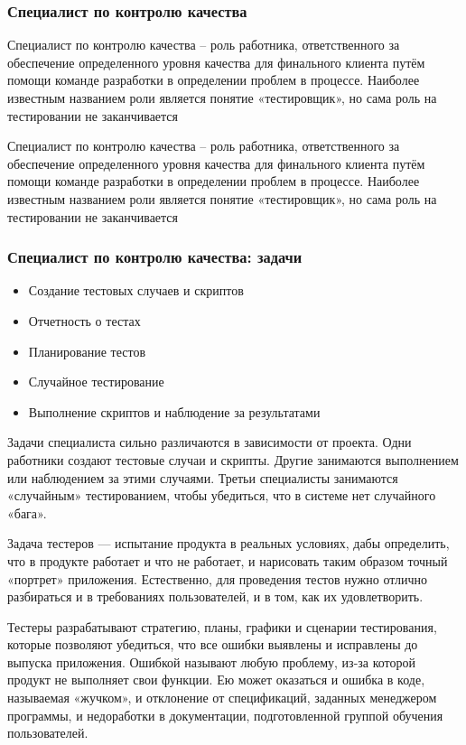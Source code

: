 \documentclass{../industrial-development}
\begin{document}
\begin{frame} \frametitle{Специалист по контролю качества}
	\begin{block}{}
		\alert {Специалист по контролю качества} – роль работника, ответственного за обеспечение определенного уровня качества для финального клиента путём помощи команде разработки в определении проблем в процессе. Наиболее известным названием роли является понятие «тестировщик», но сама роль на тестировании не заканчивается
	\end{block}
	
\end{frame}

\lecturenotes

Специалист по контролю качества – роль работника, ответственного за обеспечение определенного уровня качества для финального клиента путём помощи команде разработки в определении проблем в процессе. Наиболее известным названием роли является понятие «тестировщик», но сама роль на тестировании не заканчивается  ~\cite{Anatomy}

\begin{frame} \frametitle{Специалист по контролю качества: задачи}
  \begin{itemize}
  \item Создание тестовых случаев и скриптов
  \item Отчетность о тестах
  \item Планирование тестов
  \item Случайное тестирование
  \item Выполнение скриптов и наблюдение за результатами 
  \end{itemize}
\end{frame}

\lecturenotes

Задачи специалиста сильно различаются в зависимости от проекта. Одни работники создают тестовые случаи и скрипты. Другие занимаются выполнением или наблюдением за этими случаями. Третьи специалисты занимаются «случайным» тестированием, чтобы убедиться, что в системе нет случайного «бага».   ~\cite{Anatomy}

Задача тестеров — испытание продукта в реальных условиях, дабы
определить, что в продукте работает и что не работает, и нарисовать таким образом точный «портрет» приложения. Естественно, для проведения тестов нужно отлично разбираться и в требованиях пользователей, и в том, как их удовлетворить.

Тестеры разрабатывают стратегию, планы, графики и сценарии
тестирования, которые позволяют убедиться, что все ошибки выявлены и исправлены до выпуска приложения. Ошибкой называют любую проблему, из-за которой продукт не выполняет свои функции. Ею может оказаться и ошибка в коде, называемая «жучком», и отклонение от спецификаций, заданных менеджером программы, и недоработки в документации, подготовленной группой обучения пользователей.
\end{document}
